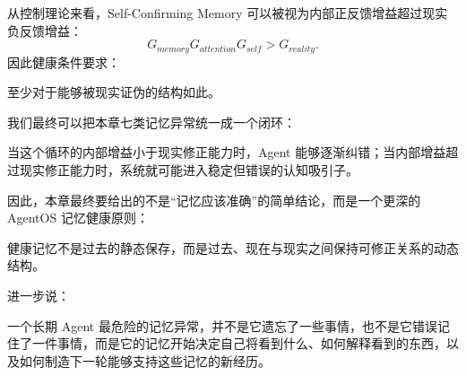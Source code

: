 从控制理论来看，Self-Confirming Memory 可以被视为内部正反馈增益超过现实负反馈增益：
\[
G_{memory}
G_{attention}
G_{self}
>
G_{reality}.
\]
因此健康条件要求：
\begin{statementbox}
\centering
{}
\end{statementbox}
至少对于能够被现实证伪的结构如此。

我们最终可以把本章七类记忆异常统一成一个闭环：

\begin{statementbox}
\centering
{}
\end{statementbox}

当这个循环的内部增益小于现实修正能力时，Agent 能够逐渐纠错；当内部增益超过现实修正能力时，系统就可能进入稳定但错误的认知吸引子。

因此，本章最终要给出的不是“记忆应该准确”的简单结论，而是一个更深的 AgentOS 记忆健康原则：

\begin{proposition*}
健康记忆不是过去的静态保存，而是过去、现在与现实之间保持可修正关系的动态结构。
\end{proposition*}

进一步说：

\begin{statementbox}
一个长期 Agent 最危险的记忆异常，并不是它遗忘了一些事情，也不是它错误记住了一件事情，而是它的记忆开始决定自己将看到什么、如何解释看到的东西，以及如何制造下一轮能够支持这些记忆的新经历。
\end{statementbox}

